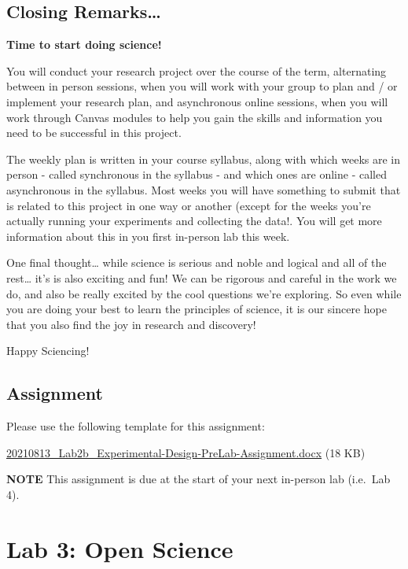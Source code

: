 \documentclass[
]{book}
\begin{document}
\hypertarget{closing-remarks}{%
\section*{Closing Remarks\ldots{}}\label{closing-remarks}}

\textbf{Time to start doing science!}

You will conduct your research project over the course of the term, alternating between in person sessions, when you will work with your group to plan and / or implement your research plan, and asynchronous online sessions, when you will work through Canvas modules to help you gain the skills and information you need to be successful in this project.

The weekly plan is written in your course syllabus, along with which weeks are in person - called synchronous in the syllabus - and which ones are online - called asynchronous in the syllabus. Most weeks you will have something to submit that is related to this project in one way or another (except for the weeks you're actually running your experiments and collecting the data!. You will get more information about this in you first in-person lab this week.

One final thought\ldots{} while science is serious and noble and logical and all of the rest\ldots{} it's is also exciting and fun! We can be rigorous and careful in the work we do, and also be really excited by the cool questions we're exploring. So even while you are doing your best to learn the principles of science, it is our sincere hope that you also find the joy in research and discovery!

Happy Sciencing!

\hypertarget{assignment}{%
\section*{Assignment}\label{assignment}}

Please use the following template for this assignment:

\href{files/20210813_Lab2b_Experimental-Design-PreLab-Assignment-V1.docx}{20210813\_Lab2b\_Experimental-Design-PreLab-Assignment.docx} (18 KB)

\textbf{NOTE} This assignment is due at the start of your next in-person lab (i.e.~Lab 4).

\hypertarget{lab-3-open-science}{%
\chapter*{Lab 3: Open Science}\label{lab-3-open-science}}
\end{document}
